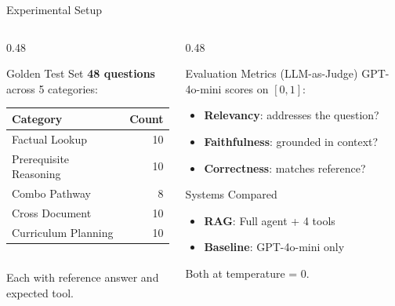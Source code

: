 \documentclass[aspectratio=169,10pt]{beamer}
\begin{document}
\begin{frame}{Experimental Setup}

\begin{columns}[T]
\begin{column}{0.48\textwidth}
\begin{block}{Golden Test Set}
\textbf{48 questions} across 5 categories:
\footnotesize
\begin{tabular}{lr}
\toprule
Category & Count \\
\midrule
Factual Lookup & 10 \\
Prerequisite Reasoning & 10 \\
Combo Pathway & 8 \\
Cross Document & 10 \\
Curriculum Planning & 10 \\
\bottomrule
\end{tabular}
\normalsize
\vspace{0.3em}\\
Each with reference answer and expected tool.
\end{block}
\end{column}

\begin{column}{0.48\textwidth}
\begin{block}{Evaluation Metrics (LLM-as-Judge)}
GPT-4o-mini scores on $[0, 1]$:
\begin{itemize}
    \item \textbf{Relevancy}: addresses the question?
    \item \textbf{Faithfulness}: grounded in context?
    \item \textbf{Correctness}: matches reference?
\end{itemize}
\end{block}

\vspace{0.3em}
\begin{block}{Systems Compared}
\begin{itemize}
    \item \textbf{RAG}: Full agent + 4 tools
    \item \textbf{Baseline}: GPT-4o-mini only
\end{itemize}
Both at temperature = 0.
\end{block}
\end{column}
\end{columns}

\end{frame}
\end{document}
